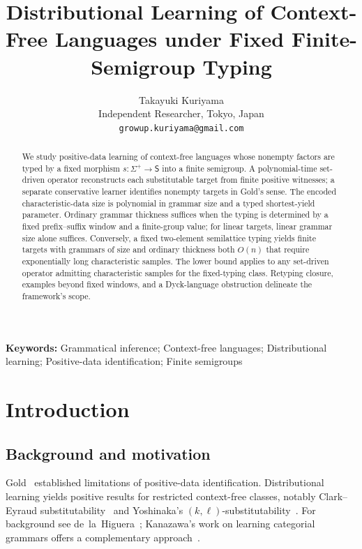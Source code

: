 \documentclass[11pt,a4paper]{article}
\title{Distributional Learning of Context-Free Languages under Fixed Finite-Semigroup Typing}
\author{Takayuki Kuriyama\\
Independent Researcher, Tokyo, Japan\\
\texttt{growup.kuriyama@gmail.com}}
\date{}
\theoremstyle{remark}
\theoremstyle{plain}
\begin{document}
\linenumbers
\maketitle

\begin{abstract}
We study positive-data learning of context-free languages whose nonempty
factors are typed by a fixed morphism $s:\Sigma^+\to\mathsf S$ into a finite
semigroup.  A polynomial-time set-driven operator reconstructs each
substitutable target from finite positive witnesses; a separate conservative
learner identifies nonempty targets in Gold's sense.  The encoded
characteristic-data size is polynomial in grammar size and a typed
shortest-yield parameter.  Ordinary grammar thickness suffices when the
typing is determined by a fixed prefix--suffix window and a finite-group
value; for linear targets, linear grammar size alone suffices.  Conversely,
a fixed two-element semilattice typing yields finite targets with
grammars of size and ordinary thickness both $O(n)$ that require exponentially long
characteristic samples.  The lower bound applies to any set-driven
operator admitting characteristic samples for the fixed-typing class.
Retyping closure, examples beyond fixed windows, and a Dyck-language
obstruction delineate the framework's scope.
\end{abstract}

\noindent\textbf{Keywords:} Grammatical inference; Context-free languages;
Distributional learning; Positive-data identification; Finite semigroups
\par\medskip

\section{Introduction}

\subsection{Background and motivation}

Gold~\cite{gold1967} established limitations of positive-data
identification. Distributional learning yields positive results
for restricted context-free classes, notably Clark--Eyraud
substitutability~\cite{clark-eyraud2007} and Yoshinaka's
$(k,\ell)$-substitutability~\cite{yoshinaka2008}.
For background see de~la~Higuera~\cite{higuera2010};
Kanazawa's work on learning categorial grammars offers a
complementary approach~\cite{kanazawa1996,kanazawa1998}.
\end{document}
